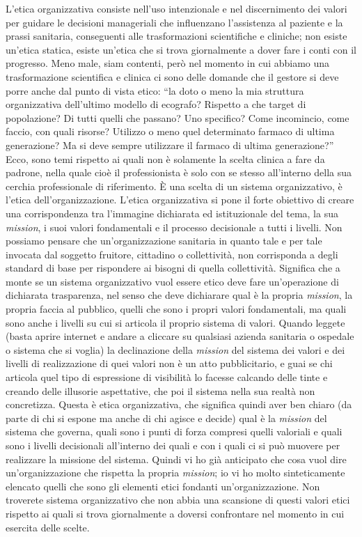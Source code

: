 L'etica organizzativa consiste nell'uso intenzionale e nel discernimento
dei valori per guidare le decisioni manageriali che influenzano
l'assistenza al paziente e la prassi sanitaria, conseguenti alle
trasformazioni scientifiche e cliniche; non esiste un'etica statica,
esiste un'etica che si trova giornalmente a dover fare i conti con il
progresso. Meno male, siam contenti, però nel momento in cui abbiamo una
trasformazione scientifica e clinica ci sono delle domande che il
gestore si deve porre anche dal punto di vista etico: ``la doto o meno
la mia struttura organizzativa dell'ultimo modello di ecografo? Rispetto
a che target di popolazione? Di tutti quelli che passano? Uno specifico?
Come incomincio, come faccio, con quali risorse? Utilizzo o meno quel
determinato farmaco di ultima generazione? Ma si deve sempre utilizzare
il farmaco di ultima generazione?'' Ecco, sono temi rispetto ai quali
non è solamente la scelta clinica a fare da padrone, nella quale cioè il
professionista è solo con se stesso all'interno della sua cerchia
professionale di riferimento. È una scelta di un sistema organizzativo,
è l'etica dell'organizzazione. L'etica organizzativa si pone il forte
obiettivo di creare una corrispondenza tra l'immagine dichiarata ed
istituzionale del tema, la sua \emph{mission}, i suoi valori
fondamentali e il processo decisionale a tutti i livelli. Non possiamo
pensare che un'organizzazione sanitaria in quanto tale e per tale
invocata dal soggetto fruitore, cittadino o collettività, non
corrisponda a degli standard di base per rispondere ai bisogni di quella
collettività. Significa che a monte se un sistema organizzativo vuol
essere etico deve fare un'operazione di dichiarata trasparenza, nel
senso che deve dichiarare qual è la propria \emph{mission}, la propria
faccia al pubblico, quelli che sono i propri valori fondamentali, ma
quali sono anche i livelli su cui si articola il proprio sistema di
valori. Quando leggete (basta aprire internet e andare a cliccare su
qualsiasi azienda sanitaria o ospedale o sistema che si voglia) la
declinazione della \emph{mission} del sistema dei valori e dei livelli
di realizzazione di quei valori non è un atto pubblicitario, e guai se
chi articola quel tipo di espressione di visibilità lo facesse calcando
delle tinte e creando delle illusorie aspettative, che poi il sistema
nella sua realtà non concretizza. Questa è etica organizzativa, che
significa quindi aver ben chiaro (da parte di chi si espone ma anche di
chi agisce e decide) qual è la \emph{mission} del sistema che governa,
quali sono i punti di forza compresi quelli valoriali e quali sono i
livelli decisionali all'interno dei quali e con i quali ci si può
muovere per realizzare la missione del sistema. Quindi vi ho già
anticipato che cosa vuol dire un'organizzazione che rispetta la propria
\emph{mission}; io vi ho molto sinteticamente elencato quelli che sono
gli elementi etici fondanti un'organizzazione. Non troverete sistema
organizzativo che non abbia una scansione di questi valori etici
rispetto ai quali si trova giornalmente a doversi confrontare nel
momento in cui esercita delle scelte.

